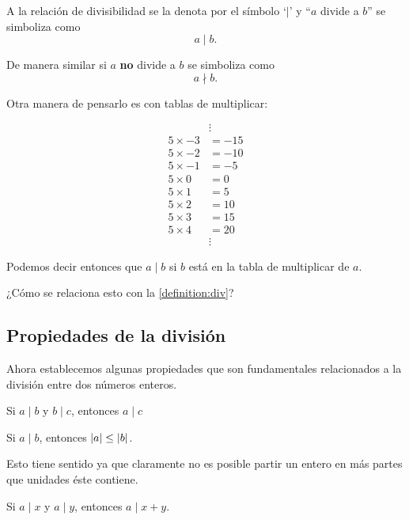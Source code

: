 A la relación de divisibilidad
se la denota por el símbolo `$\mid$'
y ``$a$ divide a $b$'' se simboliza como
\[a \mid b.\]

De manera similar si $a$ \textbf{no}
divide a $b$ se simboliza como
\[a \nmid b.\]

Otra manera de pensarlo es
con tablas de multiplicar:

\begin{align*}
	            & \vdots \\
	5 \times -3 & = -15  \\
	5 \times -2 & = -10  \\
	5 \times -1 & = -5   \\
	5 \times 0  & = 0    \\
	5 \times 1  & = 5    \\
	5 \times 2  & = 10   \\
	5 \times 3  & = 15   \\
	5 \times 4  & = 20   \\
	            & \vdots
\end{align*}

Podemos decir entonces que
$a \mid b$ si $b$ está en la
tabla de multiplicar de $a$.

\begin{question*}
	¿Cómo se relaciona esto con
	la \autoref{definition:div}?
\end{question*}

\subsection{Propiedades de la división}
Ahora establecemos algunas propiedades
que son fundamentales relacionados a
la división entre dos números enteros.

\begin{proposition}
	\label{proposition:transitivitydiv}
	Si $a \mid b$ y $b \mid c$, entonces $a \mid c$
\end{proposition}

\begin{proposition}
	Si $a \mid b$, entonces $\left\lvert a \right\rvert \leq \left\lvert b \right\rvert$.
\end{proposition}

Esto tiene sentido ya que
claramente no es posible partir un
entero en más partes que unidades éste
contiene.

\begin{proposition}
	\label{proposition:sumdiv}
	Si $a \mid x$ y $a \mid y$, entonces
	$a \mid x + y$.
\end{proposition}

